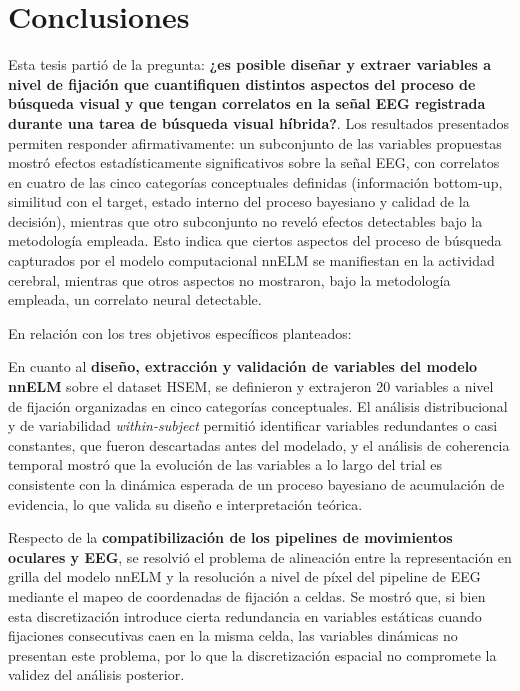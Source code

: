 \chapter{Conclusiones}
\label{ch:conclusiones}


Esta tesis partió de la pregunta: \textbf{¿es posible diseñar y extraer variables
a nivel de fijación que cuantifiquen distintos aspectos
del proceso de búsqueda visual y que tengan correlatos en la señal EEG registrada durante una
tarea de búsqueda visual híbrida?}. Los resultados presentados permiten responder afirmativamente: un subconjunto de las variables propuestas mostró efectos estadísticamente significativos sobre la señal EEG, con correlatos en cuatro de las cinco categorías conceptuales definidas (información bottom-up, similitud con el target, estado interno del proceso bayesiano y calidad de la decisión), mientras que otro subconjunto no reveló efectos detectables bajo la metodología empleada. Esto indica que ciertos aspectos del proceso de búsqueda capturados por el modelo computacional nnELM se manifiestan en la actividad cerebral, mientras que otros aspectos no mostraron, bajo la metodología empleada, un correlato neural detectable.

En relación con los tres objetivos específicos planteados:

En cuanto al \textbf{diseño, extracción y validación de variables del modelo nnELM} sobre el dataset HSEM, se definieron y extrajeron 20 variables a nivel de fijación organizadas en cinco categorías conceptuales. El análisis distribucional y de variabilidad \textit{within-subject} permitió identificar variables redundantes o casi constantes, que fueron descartadas antes del modelado, y el análisis de coherencia temporal mostró que la evolución de las variables a lo largo del trial es consistente con la dinámica esperada de un proceso bayesiano de acumulación de evidencia, lo que valida su diseño e interpretación teórica.

Respecto de la \textbf{compatibilización de los pipelines de movimientos oculares y EEG}, se resolvió el problema de alineación entre la representación en grilla del modelo nnELM y la resolución a nivel de píxel del pipeline de EEG mediante el mapeo de coordenadas de fijación a celdas. Se mostró que, si bien esta discretización introduce cierta redundancia en variables estáticas cuando fijaciones consecutivas caen en la misma celda, las variables dinámicas no presentan este problema, por lo que la discretización espacial no compromete la validez del análisis posterior.

